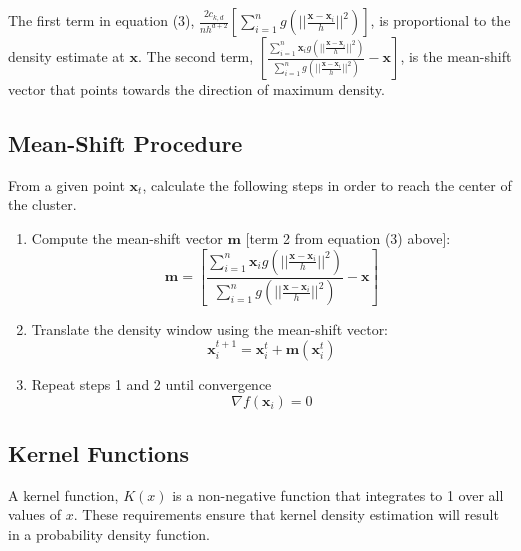\documentclass{article}
\begin{document}
The first term in equation (3), $\frac{2c_{k,d}}{nh^{d+2}}\left[\sum_{i=1}^ng\left(||\frac{\mathbf{x}-\mathbf{x}_i}{h}||^2\right)\right]$, is proportional to the density estimate at $\mathbf{x}$. The second term, $\left[\frac{\sum_{i=1}^n\mathbf{x}_ig\left(||\frac{\mathbf{x}-\mathbf{x}_i}{h}||^2\right)}{\sum_{i=1}^ng\left(||\frac{\mathbf{x}-\mathbf{x}_i}{h}||^2\right)}-\mathbf{x}\right]$, is the mean-shift vector that points towards the direction of maximum density.

\subsection{Mean-Shift Procedure}

From a given point $\mathbf{x}_t$, calculate the following steps in order to reach the center of the cluster.
\begin{enumerate}
	\item Compute the mean-shift vector $\mathbf{m}$ [term 2 from equation (3) above]:
    \begin{equation}
    \mathbf{m}=\left[\frac{\sum_{i=1}^n\mathbf{x}_ig\left(||\frac{\mathbf{x}-\mathbf{x}_i}{h}||^2\right)}{\sum_{i=1}^ng\left(||\frac{\mathbf{x}-\mathbf{x}_i}{h}||^2\right)}-\mathbf{x}\right]
    \end{equation}
    \item Translate the density window using the mean-shift vector:
    \begin{equation}
    \mathbf{x}_i^{t+1}=\mathbf{x}_i^t+\mathbf{m}(\mathbf{x}_i^t)
    \end{equation}
    \item Repeat steps 1 and 2 until convergence
    \begin{equation}
    \nabla f(\mathbf{x}_i)=0
    \end{equation}
\end{enumerate}

\subsection{Kernel Functions}

A kernel function, $K(x)$ is a non-negative function that integrates to 1 over all values of $x$. These requirements ensure that kernel density estimation will result in a probability density function.
\end{document}

